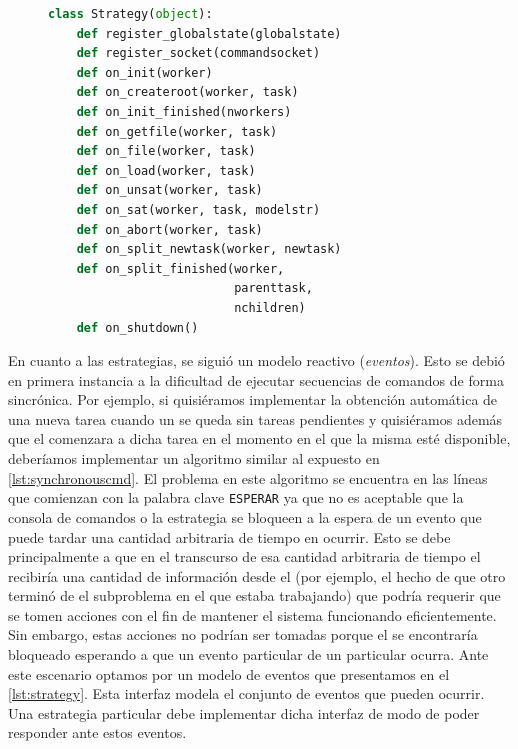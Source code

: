 \begin{figure}
\begin{footnotesize}
\begin{lstlisting}[language=Python,caption=Interfaz Strategy,label=lst:strategy]
class Strategy(object):
	def register_globalstate(globalstate)
	def register_socket(commandsocket)
	def on_init(worker)
	def on_createroot(worker, task)
	def on_init_finished(nworkers)
	def on_getfile(worker, task)
	def on_file(worker, task)
	def on_load(worker, task)
	def on_unsat(worker, task)
	def on_sat(worker, task, modelstr)
	def on_abort(worker, task)
	def on_split_newtask(worker, newtask)
	def on_split_finished(worker, 
	                      parenttask, 
	                      nchildren)
	def on_shutdown()
\end{lstlisting}
\end{footnotesize}
\end{figure}

En cuanto a las estrategias, se siguió un modelo reactivo (\emph{eventos}).
Esto se debió en primera instancia a la dificultad de ejecutar secuencias de
comandos de forma sincrónica. Por ejemplo, si quisiéramos implementar la
obtención automática de una nueva tarea cuando un \w se queda sin tareas
pendientes y quisiéramos además que el \w comenzara a \solvear dicha tarea en
el momento en el que la misma esté disponible, deberíamos implementar un
algoritmo similar al expuesto en \lst\ref{lst:synchronouscmd}. El problema en
este algoritmo se encuentra en las líneas que comienzan con la palabra clave
\texttt{ESPERAR} ya que no es aceptable que la consola de comandos o la
estrategia se bloqueen a la espera de un evento que puede tardar una cantidad
arbitraria de tiempo en ocurrir. Esto se debe principalmente a que en el
transcurso de esa cantidad arbitraria de tiempo el \fend recibiría una
cantidad de información desde el \bend (por ejemplo, el hecho de que otro \w
terminó de \solvear el subproblema en el que estaba trabajando) que podría
requerir que se tomen acciones con el fin de mantener el sistema funcionando
eficientemente. Sin embargo, estas acciones no podrían ser tomadas porque el
\fend se encontraría bloqueado esperando a que un evento particular de un \w
particular ocurra. Ante este escenario optamos por un modelo de eventos que
presentamos en el \lst\ref{lst:strategy}. Esta interfaz modela el conjunto de
eventos que pueden ocurrir. Una estrategia particular debe implementar dicha
interfaz de modo de poder responder ante estos eventos.


